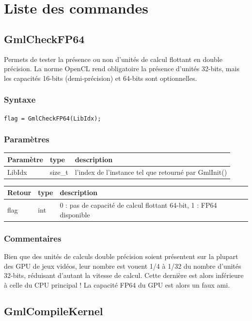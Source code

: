 \documentclass[a4paper,12pt]{article}
\begin{document}
%
%

\section{Liste des commandes}

\subsection{GmlCheckFP64}

Permets de tester la présence ou non d'unités de calcul flottant en double précision.
La norme OpenCL rend obligatoire la présence d'unités 32-bits, mais les capacités 16-bits (demi-précision) et 64-bits sont optionnelles.

\subsubsection*{Syntaxe}
{\tt flag = GmlCheckFP64(LibIdx);}
\subsubsection*{Paramètres}

\begin{tabular}{|m{2cm}|m{1.5cm}|m{10.5cm}|}
\hline
Paramètre  & type    & description \\
\hline
LibIdx     & size\_t & l'index de l'instance tel que retourné par GmlInit() \\
\hline
\end{tabular}

\medskip

\begin{tabular}{|m{2cm}|m{1.5cm}|m{10.5cm}|}
\hline
Retour     & type   & description \\
\hline
flag       & int    & 0 : pas de capacité de calcul flottant 64-bit, 1 : FP64 disponible \\
\hline
\end{tabular}
\subsubsection*{Commentaires}
Bien que des unités de calculs double précision soient présentent sur la plupart des GPU de jeux vidéos, leur nombre est vouent 1/4 à 1/32 du nombre d'unités 32-bits, réduisant d'autant la vitesse de calcul.
Cette dernière est alors inférieure à celle du CPU principal !
La capacité FP64 du GPU est alors un faux ami.

\subsection{GmlCompileKernel}
\end{document}
